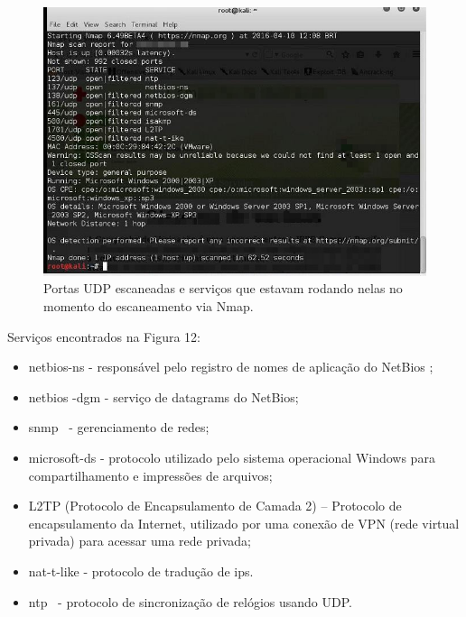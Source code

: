 \documentclass[
    12pt,               %
    openright,          %
    oneside,            %
    a4paper,            %
    section=TITLE,     %
    english,            %
    french,             %
    spanish,            %
    brazil              %
    ]{abntex2}
\newcommand{\citep}{\cite}
\begin{document}
\begin{figure}[htp]
\centering
\caption{Portas UDP escaneadas e serviços que estavam rodando nelas no momento do escaneamento via Nmap.}
\includegraphics[width=450px]{image6.jpeg}
\end{figure}
\ifdefined\FloatBarrier \FloatBarrier \fi


Serviços encontrados na Figura 12:



\begin{itemize}
	
\item netbios-ns - responsável pelo registro de nomes de aplicação do NetBios \citep{62208};
	
\item netbios -dgm - serviço de datagrams do NetBios;
	
\item snmp~\citep{62209} - gerenciamento de redes;
	
\item microsoft-ds - protocolo utilizado pelo sistema operacional Windows para compartilhamento e impressões de arquivos;
	
\item L2TP (Protocolo de Encapsulamento de Camada 2) \citep{62215}-- Protocolo de encapsulamento da Internet, utilizado por uma conexão de VPN (rede virtual privada) para acessar uma rede privada;
	
\item nat-t-like - protocolo de tradução de ips.
	
\item ntp \citep{62207}~- protocolo de sincronização de relógios usando UDP.

\end{itemize}
\end{document}
